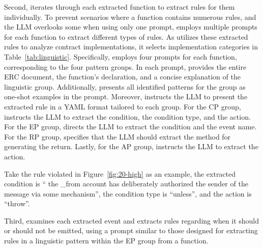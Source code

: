 Second, \Tool{} iterates through each extracted function 
to extract rules for them individually. 
To prevent scenarios where a function contains numerous rules, 
and the LLM overlooks some when using only one prompt, 
\Tool{} employs multiple prompts for each function to extract different types of rules. 
As \Tool{} utilizes these extracted rules to analyze contract implementations, it selects implementation categories in Table~\ref{tab:linguistic}. 
Specifically, \Tool{} employs four prompts for each function, corresponding to the four pattern groups.
In each prompt, \Tool{} provides the entire ERC document, the function’s declaration, and a concise explanation of the linguistic group. Additionally, \Tool{} presents all identified patterns for the group as one-shot examples in the prompt. 
Moreover, \Tool{} instructs the LLM to present the extracted rule in a YAML format tailored to each group.
For the CP group, \Tool{} instructs the LLM to extract the condition, the condition type, and the action. For the EP group, 
\Tool{} directs the LLM to extract the condition and the event name. For the RP group, \Tool{} specifies that the LLM should extract the method for generating the return. Lastly, for the AP group, \Tool{} instructs the LLM to extract the action.

Take the rule violated in Figure~\ref{fig:20-high} as an example, 
the extracted condition is `` the \_from account has deliberately authorized the sender of the message via some mechanism'', the condition type is ``unless'', and the action is ``throw''.  

Third, \Tool{} examines each extracted event and extracts 
rules regarding when it should or should not be emitted, 
using a prompt similar to those designed for extracting rules in a linguistic pattern within the EP group from a function.



